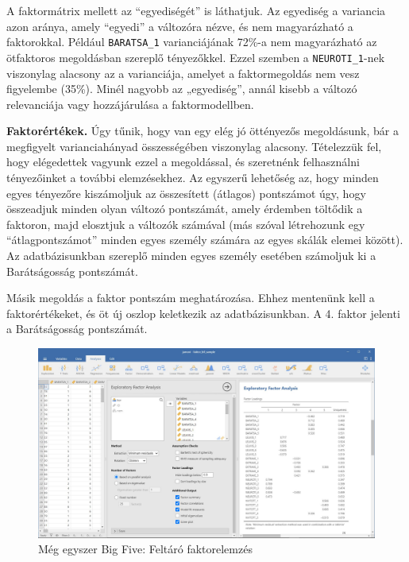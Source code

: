 \documentclass[
  letterpaper,
]{krantz}
\begin{document}
A faktormátrix mellett az ``egyediségét'' is láthatjuk. Az egyediség a
variancia azon aránya, amely ``egyedi'' a változóra nézve, és nem
magyarázható a faktorokkal. Például \texttt{BARATSA\_1} varianciájának
72\%-a nem magyarázható az ötfaktoros megoldásban szereplő tényezőkkel.
Ezzel szemben a \texttt{NEUROTI\_1}-nek viszonylag alacsony az a
varianciája, amelyet a faktormegoldás nem vesz figyelembe (35\%). Minél
nagyobb az „egyediség'', annál kisebb a változó relevanciája vagy
hozzájárulása a faktormodellben.

\textbf{Faktorértékek.} Úgy tűnik, hogy van egy elég jó öttényezős
megoldásunk, bár a megfigyelt varianciahányad összességében viszonylag
alacsony. Tételezzük fel, hogy elégedettek vagyunk ezzel a megoldással,
és szeretnénk felhasználni tényezőinket a további elemzésekhez. Az
egyszerű lehetőség az, hogy minden egyes tényezőre kiszámoljuk az
összesített (átlagos) pontszámot úgy, hogy összeadjuk minden olyan
változó pontszámát, amely érdemben töltődik a faktoron, majd elosztjuk a
változók számával (más szóval létrehozunk egy ``átlagpontszámot'' minden
egyes személy számára az egyes skálák elemei között). Az adatbázisunkban
szereplő minden egyes személy esetében számoljuk ki a Barátságosság
pontszámát.

Másik megoldás a faktor pontszám meghatározása. Ehhez mentenünk kell a
faktorértékeket, és öt új oszlop keletkezik az adatbázisunkban. A 4.
faktor jelenti a Barátságosság pontszámát.

\begin{figure}

{\centering \includegraphics{./images/faktor_bfi_sample_kep_01.jpg}

}

\caption{Még egyszer Big Five: Feltáró faktorelemzés}

\end{figure}
\end{document}
